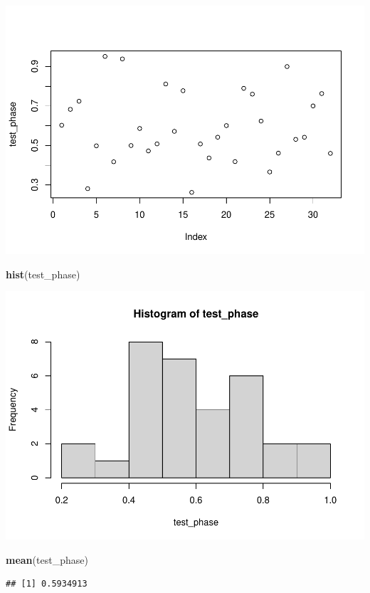 \documentclass[
]{book}
\newenvironment{Shaded}{\begin{snugshade}}{\end{snugshade}}
\newcommand{\FunctionTok}[1]{\textcolor[rgb]{0.13,0.29,0.53}{\textbf{#1}}}
\newcommand{\NormalTok}[1]{#1}
\begin{document}
\includegraphics{Statistics_Lab_files/figure-latex/unnamed-chunk-170-1.pdf}

\begin{Shaded}
\begin{Highlighting}[]
\FunctionTok{hist}\NormalTok{(test\_phase)}
\end{Highlighting}
\end{Shaded}

\includegraphics{Statistics_Lab_files/figure-latex/unnamed-chunk-170-2.pdf}

\begin{Shaded}
\begin{Highlighting}[]
\FunctionTok{mean}\NormalTok{(test\_phase)}
\end{Highlighting}
\end{Shaded}

\begin{verbatim}
## [1] 0.5934913
\end{verbatim}
\end{document}
